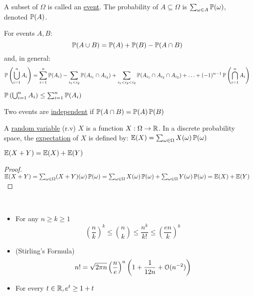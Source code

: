 A subset of $\Omega$ is called an \underline{event}.
The probability of $A \subseteq \Omega$ is $\sum_{\omega \in A} \operatorname{\mathbb{P}}(\omega)$, denoted $\operatorname{\mathbb{P}}(A)$.

\begin{proposition}
    For events $A, B$:
    $$\operatorname{\mathbb{P}}(A \cup B) = \operatorname{\mathbb{P}}(A) + \operatorname{\mathbb{P}}(B) - \operatorname{\mathbb{P}}(A \cap B)$$
    and, in general:
    $$\operatorname{\mathbb{P}}\left(\bigcup_{i = 1}^n A_i\right) = \sum_{i = 1}^n \operatorname{\mathbb{P}}(A_i) - \sum_{i_1 < i_2} \operatorname{\mathbb{P}}(A_{i_1} \cap A_{i_2}) + \sum_{i_1 < i_2 < i_3} \operatorname{\mathbb{P}}(A_{i_1} \cap A_{i_2} \cap A_{i_3}) + \ldots + (-1)^{n-1} \operatorname{\mathbb{P}}\left(\bigcap_{i=1}^n A_i\right)$$
\end{proposition}

\begin{corollary}
    $\operatorname{\mathbb{P}}\left(\bigcup_{i=1}^n A_i\right) \leq \sum_{i=1}^n \operatorname{\mathbb{P}}(A_i)$
\end{corollary}

\begin{definition}
    Two events are \underline{independent} if $\operatorname{\mathbb{P}}(A \cap B) = \operatorname{\mathbb{P}}(A)\operatorname{\mathbb{P}}(B)$
\end{definition}

\begin{definition}
    A \underline{random variable} (r.v) $X$ is a function $X: \Omega \rightarrow \operatorname{\mathbb{R}}$.
    In a discrete probability space, the \underline{expectation} of $X$ is defined by: $\operatorname{\mathbb{E}}(X) = \sum_{\omega \in \Omega} X(\omega)\operatorname{\mathbb{P}}(\omega)$
\end{definition}

\begin{proposition}
    $\operatorname{\mathbb{E}}(X + Y) = \operatorname{\mathbb{E}}(X) + \operatorname{\mathbb{E}}(Y)$
\end{proposition}
\begin{proof}
    $\operatorname{\mathbb{E}}(X + Y) = \sum_{\omega \in \Omega} (X+Y)(\omega)\operatorname{\mathbb{P}}(\omega) = \sum_{\omega \in \Omega} X(\omega)\operatorname{\mathbb{P}}(\omega) + \sum_{\omega \in \Omega} Y(\omega)\operatorname{\mathbb{P}}(\omega) = \operatorname{\mathbb{E}}(X) + \operatorname{\mathbb{E}}(Y)$  
\end{proof}

\begin{lemma}
    ~
    \begin{itemize}
        \item For any $n \geq k \geq 1$
        \begin{equation*}
            \left(\frac{n}{k}\right)^k \leq \binom{n}{k} \leq \frac{n^k}{k!} \leq \left(\frac{en}{k}\right)^k
        \end{equation*}

        \item (Stirling's Formula)
        \begin{equation*}
            n! = \sqrt{2\pi n}\left(\frac{n}{e}\right)^n\left(1 + \frac{1}{12n} + \operatorname{\mathcal{O}}(n^{-2})\right)
        \end{equation*}

        \item For every $t \in \operatorname{\mathbb{R}}, e^t \geq 1 + t$ 
    \end{itemize}
\end{lemma}

